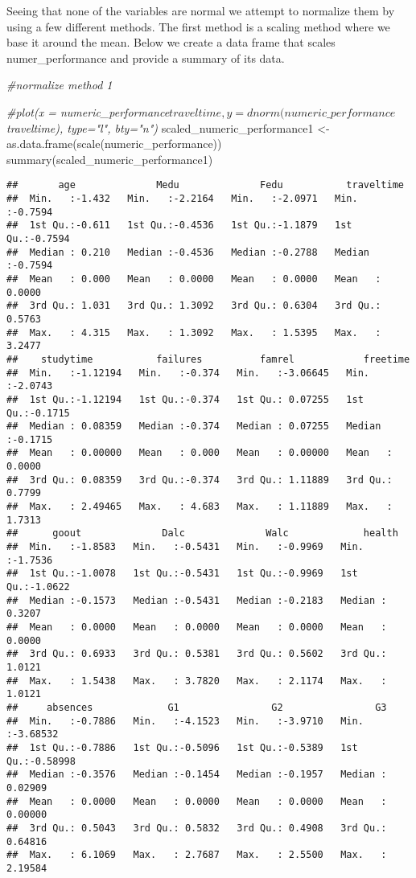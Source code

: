 \documentclass[
]{article}
\newenvironment{Shaded}{\begin{snugshade}}{\end{snugshade}}
\newcommand{\CommentTok}[1]{\textcolor[rgb]{0.56,0.35,0.01}{\textit{#1}}}
\newcommand{\FunctionTok}[1]{\textcolor[rgb]{0.00,0.00,0.00}{#1}}
\newcommand{\NormalTok}[1]{#1}
\newcommand{\OtherTok}[1]{\textcolor[rgb]{0.56,0.35,0.01}{#1}}
\begin{document}
Seeing that none of the variables are normal we attempt to normalize
them by using a few different methods. The first method is a scaling
method where we base it around the mean. Below we create a data frame
that scales numer\_performance and provide a summary of its data.

\begin{Shaded}
\begin{Highlighting}[]
\CommentTok{\#normalize method 1}

\CommentTok{\#plot(x = numeric\_performance$traveltime, y = dnorm(numeric\_performance$traveltime), type="l", bty="n")}
\NormalTok{scaled\_numeric\_performance1 }\OtherTok{\textless{}{-}} \FunctionTok{as.data.frame}\NormalTok{(}\FunctionTok{scale}\NormalTok{(numeric\_performance))}
\FunctionTok{summary}\NormalTok{(scaled\_numeric\_performance1)}
\end{Highlighting}
\end{Shaded}

\begin{verbatim}
##       age              Medu              Fedu           traveltime     
##  Min.   :-1.432   Min.   :-2.2164   Min.   :-2.0971   Min.   :-0.7594  
##  1st Qu.:-0.611   1st Qu.:-0.4536   1st Qu.:-1.1879   1st Qu.:-0.7594  
##  Median : 0.210   Median :-0.4536   Median :-0.2788   Median :-0.7594  
##  Mean   : 0.000   Mean   : 0.0000   Mean   : 0.0000   Mean   : 0.0000  
##  3rd Qu.: 1.031   3rd Qu.: 1.3092   3rd Qu.: 0.6304   3rd Qu.: 0.5763  
##  Max.   : 4.315   Max.   : 1.3092   Max.   : 1.5395   Max.   : 3.2477  
##    studytime           failures          famrel            freetime      
##  Min.   :-1.12194   Min.   :-0.374   Min.   :-3.06645   Min.   :-2.0743  
##  1st Qu.:-1.12194   1st Qu.:-0.374   1st Qu.: 0.07255   1st Qu.:-0.1715  
##  Median : 0.08359   Median :-0.374   Median : 0.07255   Median :-0.1715  
##  Mean   : 0.00000   Mean   : 0.000   Mean   : 0.00000   Mean   : 0.0000  
##  3rd Qu.: 0.08359   3rd Qu.:-0.374   3rd Qu.: 1.11889   3rd Qu.: 0.7799  
##  Max.   : 2.49465   Max.   : 4.683   Max.   : 1.11889   Max.   : 1.7313  
##      goout              Dalc              Walc             health       
##  Min.   :-1.8583   Min.   :-0.5431   Min.   :-0.9969   Min.   :-1.7536  
##  1st Qu.:-1.0078   1st Qu.:-0.5431   1st Qu.:-0.9969   1st Qu.:-1.0622  
##  Median :-0.1573   Median :-0.5431   Median :-0.2183   Median : 0.3207  
##  Mean   : 0.0000   Mean   : 0.0000   Mean   : 0.0000   Mean   : 0.0000  
##  3rd Qu.: 0.6933   3rd Qu.: 0.5381   3rd Qu.: 0.5602   3rd Qu.: 1.0121  
##  Max.   : 1.5438   Max.   : 3.7820   Max.   : 2.1174   Max.   : 1.0121  
##     absences             G1                G2                G3          
##  Min.   :-0.7886   Min.   :-4.1523   Min.   :-3.9710   Min.   :-3.68532  
##  1st Qu.:-0.7886   1st Qu.:-0.5096   1st Qu.:-0.5389   1st Qu.:-0.58998  
##  Median :-0.3576   Median :-0.1454   Median :-0.1957   Median : 0.02909  
##  Mean   : 0.0000   Mean   : 0.0000   Mean   : 0.0000   Mean   : 0.00000  
##  3rd Qu.: 0.5043   3rd Qu.: 0.5832   3rd Qu.: 0.4908   3rd Qu.: 0.64816  
##  Max.   : 6.1069   Max.   : 2.7687   Max.   : 2.5500   Max.   : 2.19584
\end{verbatim}
\end{document}
